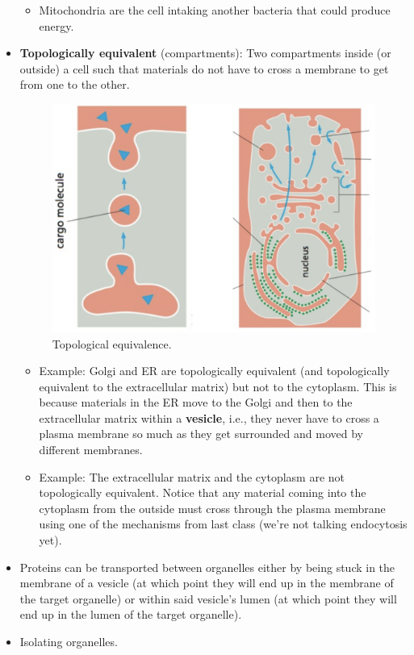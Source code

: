\documentclass[../notes.tex]{subfiles}
\begin{document}
\begin{itemize}
\begin{itemize}
        \item Mitochondria are the cell intaking another bacteria that could produce energy.
    \end{itemize}
    \item \textbf{Topologically equivalent} (compartments): Two compartments inside (or outside) a cell such that materials do not have to cross a membrane to get from one to the other.
    \begin{figure}[h!]
        \centering
        \includegraphics[width=0.4\linewidth]{../ExtFiles/topologicalEquivalence.png}
        \caption{Topological equivalence.}
        \label{fig:topologicalEquivalence}
    \end{figure}
    \begin{itemize}
        \item Example: Golgi and ER are topologically equivalent (and topologically equivalent to the extracellular matrix) but not to the cytoplasm. This is because materials in the ER move to the Golgi and then to the extracellular matrix within a \textbf{vesicle}, i.e., they never have to cross a plasma membrane so much as they get surrounded and moved by different membranes.
        \item Example: The extracellular matrix and the cytoplasm are not topologically equivalent. Notice that any material coming into the cytoplasm from the outside must cross through the plasma membrane using one of the mechanisms from last class (we're not talking endocytosis yet).
    \end{itemize}
    \item Proteins can be transported between organelles either by being stuck in the membrane of a vesicle (at which point they will end up in the membrane of the target organelle) or within said vesicle's lumen (at which point they will end up in the lumen of the target organelle).
    \item Isolating organelles.
    \begin{figure}[h!]
        \centering

\end{figure}
\end{itemize}
\end{document}
